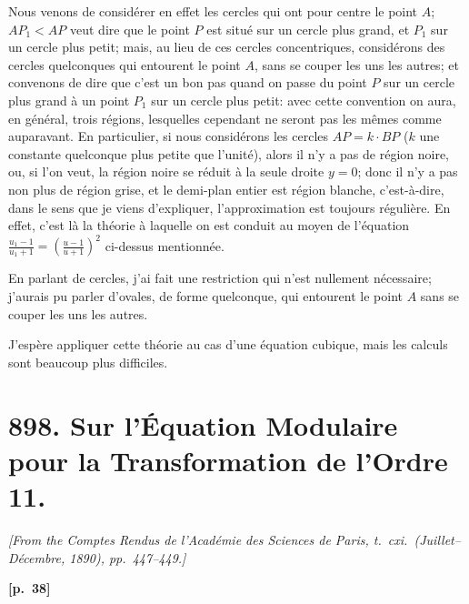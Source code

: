 \documentclass[11pt,a4paper]{book}
\begin{document}
Nous venons de consid\'erer en effet les cercles qui ont pour centre le point $A$; $AP_1 < AP$ veut dire que le point $P$ est situ\'e sur un cercle plus grand, et $P_1$ sur un cercle plus petit; mais, au lieu de ces cercles concentriques, consid\'erons des cercles quelconques qui entourent le point $A$, sans se couper les uns les autres; et convenons de dire que c'est un bon pas quand on passe du point $P$ sur un cercle plus grand \`a un point $P_1$ sur un cercle plus petit: avec cette convention on aura, en g\'en\'eral, trois r\'egions, lesquelles cependant ne seront pas les m\^emes comme auparavant. En particulier, si nous consid\'erons les cercles $AP = k \cdot BP$ ($k$ une constante quelconque plus petite que l'unit\'e), alors il n'y a pas de r\'egion noire, ou, si l'on veut, la r\'egion noire se r\'eduit \`a la seule droite $y = 0$; donc il n'y a pas non plus de r\'egion grise, et le demi-plan entier est r\'egion blanche, c'est-\`a-dire, dans le sens que je viens d'expliquer, l'approximation est toujours r\'eguli\`ere. En effet, c'est l\`a la th\'eorie \`a laquelle on est conduit au moyen de l'\'equation $\frac{u_1 - 1}{u_1 + 1} = \left(\frac{u - 1}{u + 1}\right)^2$ ci-dessus mentionn\'ee.

En parlant de cercles, j'ai fait une restriction qui n'est nullement n\'ecessaire; j'aurais pu parler d'ovales, de forme quelconque, qui entourent le point $A$ sans se couper les uns les autres.

J'esp\`ere appliquer cette th\'eorie au cas d'une \'equation cubique, mais les calculs sont beaucoup plus difficiles.

\newpage

\section*{898. Sur l'\'Equation Modulaire pour la Transformation de l'Ordre 11.}

\noindent\textit{[From the Comptes Rendus de l'Acad\'emie des Sciences de Paris, t.\ cxi.\ (Juillet--D\'ecembre, 1890), pp.\ 447--449.]}

\vspace{0.5em}
\noindent\textbf{[p.\ 38]}
\end{document}
